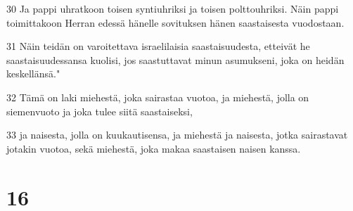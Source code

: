\par 30 Ja pappi uhratkoon toisen syntiuhriksi ja toisen polttouhriksi. Näin pappi toimittakoon Herran edessä hänelle sovituksen hänen saastaisesta vuodostaan.
\par 31 Näin teidän on varoitettava israelilaisia saastaisuudesta, etteivät he saastaisuudessansa kuolisi, jos saastuttavat minun asumukseni, joka on heidän keskellänsä."
\par 32 Tämä on laki miehestä, joka sairastaa vuotoa, ja miehestä, jolla on siemenvuoto ja joka tulee siitä saastaiseksi,
\par 33 ja naisesta, jolla on kuukautisensa, ja miehestä ja naisesta, jotka sairastavat jotakin vuotoa, sekä miehestä, joka makaa saastaisen naisen kanssa.

\chapter{16}

